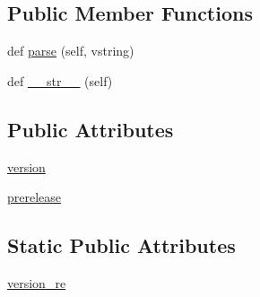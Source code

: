 \subsection*{Public Member Functions}
\begin{DoxyCompactItemize}
\item 
def \hyperlink{classsetuptools_1_1__distutils_1_1version_1_1StrictVersion_ab5aaefcdcab1ab487508edeb29821e27}{parse} (self, vstring)
\item 
def \hyperlink{classsetuptools_1_1__distutils_1_1version_1_1StrictVersion_a9d0e48fb3db8e0bdb6635bffd8a63a9b}{\+\_\+\+\_\+str\+\_\+\+\_\+} (self)
\end{DoxyCompactItemize}
\subsection*{Public Attributes}
\begin{DoxyCompactItemize}
\item 
\hyperlink{classsetuptools_1_1__distutils_1_1version_1_1StrictVersion_a3dedcc2c334c6567e2d92964b3f07c99}{version}
\item 
\hyperlink{classsetuptools_1_1__distutils_1_1version_1_1StrictVersion_a6f58633fa840cf359d88af0a22580c4d}{prerelease}
\end{DoxyCompactItemize}
\subsection*{Static Public Attributes}
\begin{DoxyCompactItemize}
\item 
\hyperlink{classsetuptools_1_1__distutils_1_1version_1_1StrictVersion_a94d0d0d109081b71e41ad7d513e5419f}{version\+\_\+re}
\end{DoxyCompactItemize}


